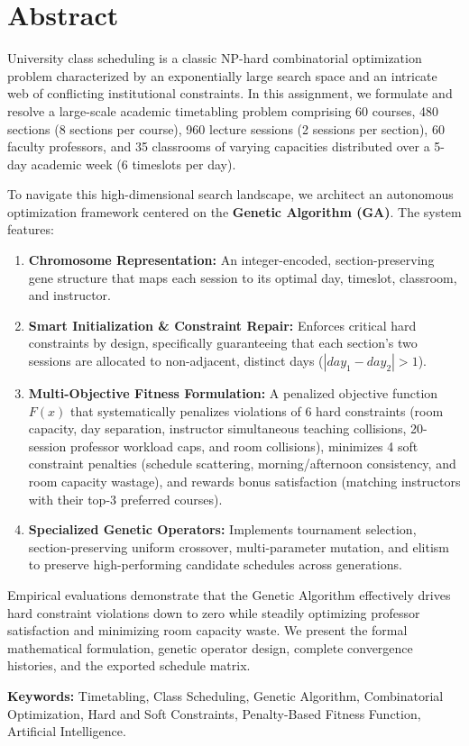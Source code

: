 \newpage

\chapter*{Abstract}

University class scheduling is a classic NP-hard combinatorial optimization problem characterized by an exponentially large search space and an intricate web of conflicting institutional constraints. In this assignment, we formulate and resolve a large-scale academic timetabling problem comprising 60 courses, 480 sections (8 sections per course), 960 lecture sessions (2 sessions per section), 60 faculty professors, and 35 classrooms of varying capacities distributed over a 5-day academic week (6 timeslots per day). 

To navigate this high-dimensional search landscape, we architect an autonomous optimization framework centered on the \textbf{Genetic Algorithm (GA)}. The system features:
\begin{enumerate}[leftmargin=1.5em]
  \item \textbf{Chromosome Representation:} An integer-encoded, section-preserving gene structure that maps each session to its optimal day, timeslot, classroom, and instructor.
  \item \textbf{Smart Initialization \& Constraint Repair:} Enforces critical hard constraints by design, specifically guaranteeing that each section's two sessions are allocated to non-adjacent, distinct days ($|day_1 - day_2| > 1$).
  \item \textbf{Multi-Objective Fitness Formulation:} A penalized objective function $F(x)$ that systematically penalizes violations of 6 hard constraints (room capacity, day separation, instructor simultaneous teaching collisions, 20-session professor workload caps, and room collisions), minimizes 4 soft constraint penalties (schedule scattering, morning/afternoon consistency, and room capacity wastage), and rewards bonus satisfaction (matching instructors with their top-3 preferred courses).
  \item \textbf{Specialized Genetic Operators:} Implements tournament selection, section-preserving uniform crossover, multi-parameter mutation, and elitism to preserve high-performing candidate schedules across generations.
\end{enumerate}

Empirical evaluations demonstrate that the Genetic Algorithm effectively drives hard constraint violations down to zero while steadily optimizing professor satisfaction and minimizing room capacity waste. We present the formal mathematical formulation, genetic operator design, complete convergence histories, and the exported schedule matrix.

\textbf{Keywords:} Timetabling, Class Scheduling, Genetic Algorithm, Combinatorial Optimization, Hard and Soft Constraints, Penalty-Based Fitness Function, Artificial Intelligence.

\newpage
